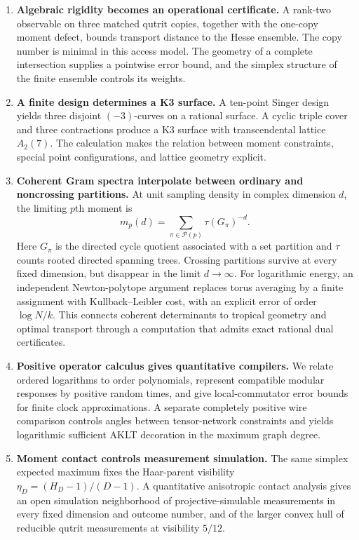 \begin{enumerate}[label=\arabic*.]
\item \textbf{Algebraic rigidity becomes an operational certificate.}
A rank-two observable on three matched qutrit copies, together with the
one-copy moment defect, bounds transport distance to the Hesse ensemble.
The copy number is minimal in this access model. The geometry of a
complete intersection supplies a pointwise error bound, and the simplex
structure of the finite ensemble controls its weights.

\item \textbf{A finite design determines a K3 surface.}
A ten-point Singer design yields three disjoint $(-3)$-curves on a rational
surface. A cyclic triple cover and three contractions produce a K3 surface
with transcendental lattice $A_2(7)$. The calculation makes the relation
between moment constraints, special point configurations, and lattice
geometry explicit.

\item \textbf{Coherent Gram spectra interpolate between ordinary and
noncrossing partitions.}
At unit sampling density in complex dimension $d$, the limiting $p$th moment is
\[
m_p(d)=\sum_{\pi\in\mathcal P(p)}\tau(G_\pi)^{-d}.
\]
Here $G_\pi$ is the directed cycle quotient associated with a set partition
and $\tau$ counts rooted directed spanning trees. Crossing partitions
survive at every fixed dimension, but disappear in the limit $d\to\infty$.
For logarithmic energy, an independent Newton-polytope argument replaces
torus averaging by a finite assignment with Kullback--Leibler cost, with
an explicit error of order $\log N/k$. This connects coherent determinants
to tropical geometry and optimal transport through a computation that
admits exact rational dual certificates.

\item \textbf{Positive operator calculus gives quantitative compilers.}
We relate ordered logarithms to order polynomials, represent compatible
modular responses by positive random times, and give local-commutator error
bounds for finite clock approximations. A separate completely positive
wire comparison controls angles between tensor-network constraints and
yields logarithmic sufficient AKLT decoration in the maximum graph degree.

\item \textbf{Moment contact controls measurement simulation.}
The same simplex expected maximum fixes the Haar-parent visibility
$\eta_D=(H_D-1)/(D-1)$. A quantitative anisotropic contact analysis gives
an open simulation neighborhood of projective-simulable measurements in
every fixed dimension and outcome number, and of the larger convex hull
of reducible qutrit measurements at visibility $5/12$.
\end{enumerate}

